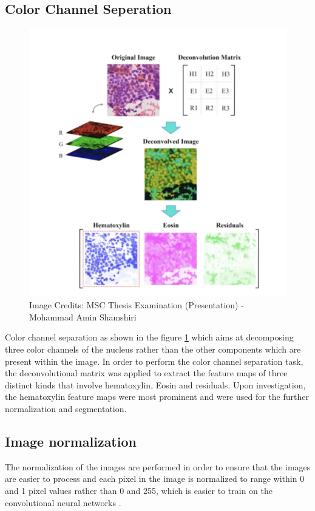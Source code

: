 \subsection{Color Channel Seperation}
\begin{figure}[!htp]
    \centering
    \includegraphics[scale=0.75]{assets/pre-processing.png}
    \caption{Image Credits: MSC Thesis Examination (Presentation) - Mohammad Amin Shamshiri}
    \label{fig:colorchannelseperation}
\end{figure}
Color channel separation as shown in the figure \ref{fig:colorchannelseperation} which aims at decomposing three color channels of the nucleus rather than the other components which are present within the image. In order to perform the color channel separation task, 
the deconvolutional matrix was applied to extract the feature maps of three distinct kinds that involve hematoxylin, Eosin and residuals. Upon investigation, the hematoxylin feature maps were most prominent and were used for the further normalization and segmentation. 


\subsection{Image normalization}
The normalization of the images are performed in order to ensure that the images are easier to process and each pixel in the image is normalized to range within 0 and 1 pixel values rather than 0 and 255, which is easier to train on the convolutional neural networks \citep{rashid_2019}.  

